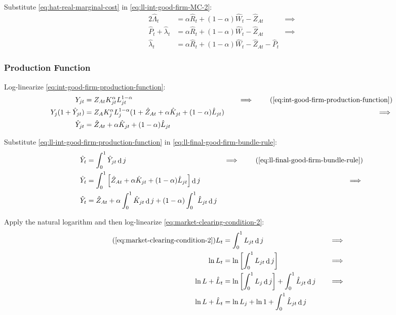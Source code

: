 \documentclass[
	12pt,
	]{article}
\numberwithin{equation}{section}
\DeclareMathOperator{\dif}{d}
\theoremstyle{definition}
\theoremstyle{plain}
\theoremstyle{plain}
\theoremstyle{plain}
\begin{document}
Substitute \ref{eq:hat-real-marginal-cost} in \ref{eq:ll-int-good-firm-MC-2}:
\begin{alignat}{2}
	\hat{\Lambda}_t &= \alpha \hat{R}_t + (1- \alpha) \hat{W}_t - \hat{Z}_{At} &\implies \nonumber \\
	\hat{P}_t + \hat{\lambda}_t &= \alpha \hat{R}_t + (1- \alpha) \hat{W}_t - \hat{Z}_{At} &\implies \nonumber \\
	\hat{\lambda}_t &= \alpha \hat{R}_t + (1- \alpha) \hat{W}_t - \hat{Z}_{At} - \hat{P}_t \label{eq:ll-int-good-firm-MC-3}
\end{alignat}


\subsubsection{Production Function}

Log-linearize \ref{eq:int-good-firm-production-function}:
\begin{alignat}{2}
	Y_{jt} &= Z_{At} K_{jt}^\alpha L_{jt}^{1-\alpha} &\implies \tag{\ref{eq:int-good-firm-production-function}} \\
	Y_{j} (1+ \hat{Y}_{jt}) &= Z_{A} K_{j}^\alpha L_{j}^{1-\alpha} (1+ \hat{Z}_{At} + \alpha \hat{K}_{jt} + (1-\alpha) \hat{L}_{jt}) \quad &\implies \nonumber \\
	\hat{Y}_{jt} &= \hat{Z}_{At} + \alpha \hat{K}_{jt} + (1-\alpha) \hat{L}_{jt} \label{eq:ll-int-good-firm-production-function}
\end{alignat}

Substitute \ref{eq:ll-int-good-firm-production-function} in \ref{eq:ll-final-good-firm-bundle-rule}:
\begin{alignat}{2}
	\hat{Y}_t &= \int_{0}^{1} \hat{Y}_{jt} \dif j &\implies \tag{\ref{eq:ll-final-good-firm-bundle-rule}} \\
	\hat{Y}_t &= \int_{0}^{1} \left[ \hat{Z}_{At} + \alpha \hat{K}_{jt} + (1-\alpha) \hat{L}_{jt} \right] \dif j &\implies \nonumber \\
	\hat{Y}_t &= \hat{Z}_{At} + \alpha \int_{0}^{1} \hat{K}_{jt} \dif j + (1-\alpha) \int_{0}^{1} \hat{L}_{jt} \dif j \label{eq:ll-final-good-firm-bundle-rule-2}
\end{alignat}

Apply the natural logarithm and then log-linearize \ref{eq:market-clearing-condition-2}:
\begin{alignat}{2}
	\tag{\ref{eq:market-clearing-condition-2}}
	L_t &= \int_{0}^{1} L_{jt} \dif j &\implies \\
	\ln L_t &= \ln \left[ \int_{0}^{1} L_{jt} \dif j \right] &\implies \nonumber \\
	\ln L + \hat{L}_t &= \ln \left[ \int_{0}^{1} L_{j} \dif j \right] + \int_{0}^{1} \hat{L}_{jt} \dif j \quad &\implies \nonumber \\
	\ln L + \hat{L}_t &= \ln L_{j} + \ln 1 + \int_{0}^{1} \hat{L}_{jt} \dif j \nonumber
\end{alignat}
\end{document}
